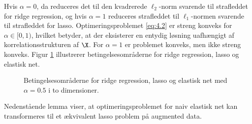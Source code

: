 Hvis $\alpha=0$, da reduceres det til den kvadrerede $\ell_2$-norm svarende til strafleddet for ridge regression, og hvis $\alpha=1$ reduceres strafleddet til $\ell_1$-normen svarende til strafleddet for lasso.
Optimeringsproblemet  \eqref{eq:4.2} er streng konveks for \(\alpha \in [0,1)\), hvilket betyder, at der eksisterer en entydig løsning uafhængigt af korrelationsstrukturen af $\X$.
For  \(\alpha=1\) er problemet konveks, men ikke streng konveks.
Figur \ref{fig:elastisk} illustrerer betingelsesområderne for ridge regression, lasso og elastisk net.
%
\begin{figure}[H]
\centering
\scalebox{0.8}{}
\caption{Betingelsesområderne for ridge regression, lasso og elastisk net med \(\alpha = 0.5\) i to dimensioner.} \label{fig:elastisk}
\end{figure}
%
%
%
%
Nedenstående lemma viser, at optimeringsproblemet for naiv elastisk net kan transformeres til et ækvivalent lasso problem på augmented data.
